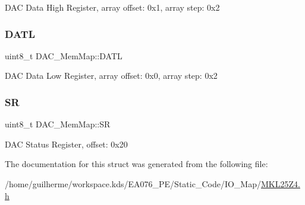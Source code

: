 D\+AC Data High Register, array offset\+: 0x1, array step\+: 0x2 \mbox{\label{struct_d_a_c___mem_map_a5e154a0937bc5d4879efb1fd80f713f0}} 
\subsubsection{\texorpdfstring{D\+A\+TL}{DATL}}
{\footnotesize\ttfamily uint8\+\_\+t D\+A\+C\+\_\+\+Mem\+Map\+::\+D\+A\+TL}

D\+AC Data Low Register, array offset\+: 0x0, array step\+: 0x2 \mbox{\label{struct_d_a_c___mem_map_a146115dd60e5e34ce6f1d8dc2b860877}} 
\subsubsection{\texorpdfstring{SR}{SR}}
{\footnotesize\ttfamily uint8\+\_\+t D\+A\+C\+\_\+\+Mem\+Map\+::\+SR}

D\+AC Status Register, offset\+: 0x20 

The documentation for this struct was generated from the following file\+:\begin{DoxyCompactItemize}
\item 
/home/guilherme/workspace.\+kds/\+E\+A076\+\_\+\+P\+E/\+Static\+\_\+\+Code/\+I\+O\+\_\+\+Map/\hyperlink{_m_k_l25_z4_8h}{M\+K\+L25\+Z4.\+h}\end{DoxyCompactItemize}

